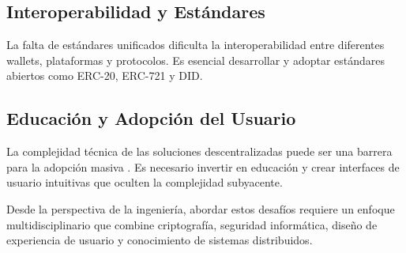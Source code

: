 \subsection{Interoperabilidad y Estándares}

La falta de estándares unificados dificulta la interoperabilidad entre diferentes wallets, plataformas y protocolos. Es esencial desarrollar y adoptar estándares abiertos como ERC-20, ERC-721 y DID.

\subsection{Educación y Adopción del Usuario}

La complejidad técnica de las soluciones descentralizadas puede ser una barrera para la adopción masiva \cite{parizi2018empirical}. Es necesario invertir en educación y crear interfaces de usuario intuitivas que oculten la complejidad subyacente.

Desde la perspectiva de la ingeniería, abordar estos desafíos requiere un enfoque multidisciplinario que combine criptografía, seguridad informática, diseño de experiencia de usuario y conocimiento de sistemas distribuidos.

